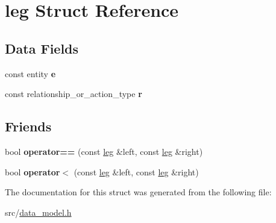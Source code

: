 \hypertarget{structleg}{}\section{leg Struct Reference}
\label{structleg}
\subsection*{Data Fields}
\begin{DoxyCompactItemize}
\item 
\mbox{\label{structleg_a25bc8afc8fdc636963b7cae1f5bbaa3b}} 
const entity {\bfseries e}
\item 
\mbox{\label{structleg_a8136189afab60f788096b94d01b91d1c}} 
const relationship\+\_\+or\+\_\+action\+\_\+type {\bfseries r}
\end{DoxyCompactItemize}
\subsection*{Friends}
\begin{DoxyCompactItemize}
\item 
\mbox{\label{structleg_a79d778afcc9e6d9a84a5e5621d9e7223}} 
bool {\bfseries operator==} (const \hyperlink{structleg}{leg} \&left, const \hyperlink{structleg}{leg} \&right)
\item 
\mbox{\label{structleg_a050cb42dbf3c9c1063f14234d5902bee}} 
bool {\bfseries operator$<$} (const \hyperlink{structleg}{leg} \&left, const \hyperlink{structleg}{leg} \&right)
\end{DoxyCompactItemize}


The documentation for this struct was generated from the following file\+:\begin{DoxyCompactItemize}
\item 
src/\hyperlink{data__model_8h}{data\+\_\+model.\+h}\end{DoxyCompactItemize}
